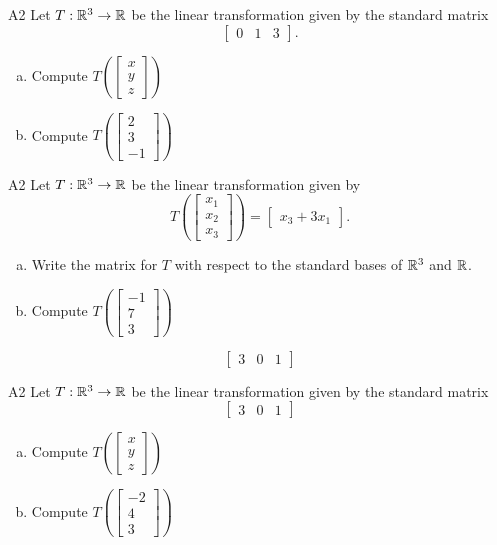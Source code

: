 \begin{problem}{A2}
Let $T: \mathbb{R}^3 \rightarrow \mathbb{R}$ be the linear transformation given by the standard matrix
$$\begin{bmatrix} 0 & 1 & 3 \end{bmatrix}.$$
\begin{enumerate}[(a)]
\item Compute \( T\left( \begin{bmatrix}x\\ y \\ z  \end{bmatrix} \right) \)
\item Compute \( T\left( \begin{bmatrix} 2 \\ 3 \\ -1\end{bmatrix} \right) \)
\end{enumerate}
\end{problem}

\begin{problem}{A2}
Let $T: \mathbb{R}^3 \rightarrow \mathbb{R}$ be the linear transformation given by $$T\left(\begin{bmatrix} x_1 \\ x_2 \\ x_3  \end{bmatrix} \right) = \begin{bmatrix} x_3+3x_1 \end{bmatrix}.$$ 
\begin{enumerate}[(a)]
\item Write the matrix for $T$ with respect to the standard bases of $\mathbb{R}^3$ and $\mathbb{R}$.
\item Compute \( T\left( \begin{bmatrix} -1 \\ 7 \\ 3\end{bmatrix} \right) \)
\end{enumerate}
\end{problem}
\begin{solution}
$$\begin{bmatrix} 3 & 0 & 1 \end{bmatrix}$$
\end{solution}

\begin{problem}{A2}
Let $T: \mathbb{R}^3 \rightarrow \mathbb{R}$ be the linear transformation given by the standard matrix
$$\begin{bmatrix} 3 & 0 & 1 \end{bmatrix}$$
\begin{enumerate}[(a)]
\item Compute \( T\left( \begin{bmatrix}x\\ y \\ z  \end{bmatrix} \right) \)
\item Compute \( T\left( \begin{bmatrix} -2 \\ 4 \\ 3\end{bmatrix} \right) \)
\end{enumerate}
\end{problem}
